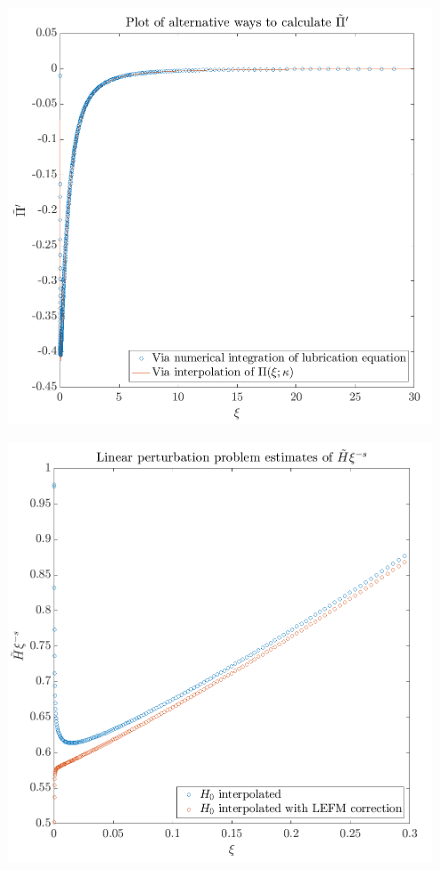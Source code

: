 \documentclass{article}
\begin{document}
\begin{figure}[!ht]\centering
\includegraphics[scale=0.3]{Pi-prime.png}
\end{figure}
\begin{figure}[!ht]\centering
\includegraphics[scale=0.3]{linear-perturb.png}
\end{figure}
\end{document}
